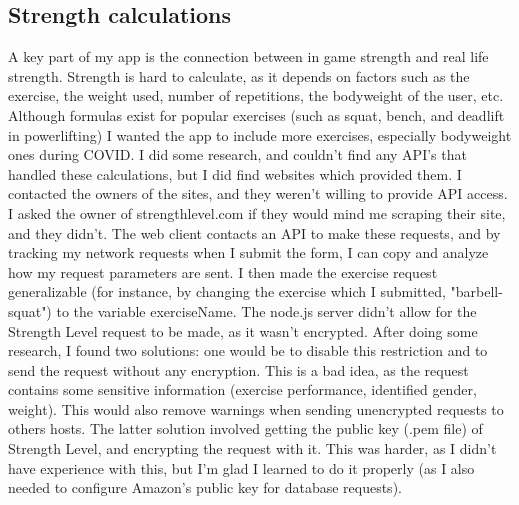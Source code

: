 \documentclass{l4proj}
\begin{document}
\subsection{Strength calculations}
A key part of my app is the connection between in game strength and real life strength. Strength is hard to calculate, as it depends on factors such as the exercise, the weight used, number of repetitions, the bodyweight of the user, etc. Although formulas exist for popular exercises (such as squat, bench, and deadlift in powerlifting) I wanted the app to include more exercises, especially bodyweight ones during COVID. I did some research, and couldn't find any API's that handled these calculations, but I did find websites which provided them. I contacted the owners of the sites, and they weren't willing to provide API access. I asked the owner of strengthlevel.com if they would mind me scraping their site, and they didn't. The web client contacts an API to make these requests, and by tracking my network requests when I submit the form, I can copy and analyze how my request parameters are sent. I then made the exercise request generalizable (for instance, by changing the exercise which I submitted, "barbell-squat") to the variable exerciseName. The node.js server didn't allow for the Strength Level request to be made, as it wasn't encrypted. After doing some research, I found two solutions: one would be to disable this restriction and to send the request without any encryption. This is a bad idea, as the request contains some sensitive information (exercise performance, identified gender, weight). This would also remove warnings when sending unencrypted requests to others hosts. The latter solution involved getting the public key (.pem file) of Strength Level, and encrypting the request with it. This was harder, as I didn't have experience with this, but I'm glad I learned to do it properly (as I also needed to configure Amazon's public key for database requests).
\end{document}
